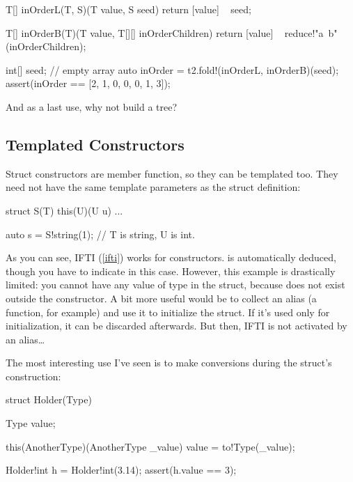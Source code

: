 \begin{dcode}
T[] inOrderL(T, S)(T value, S seed)
{
    return [value] ~ seed;
}

T[] inOrderB(T)(T value, T[][] inOrderChildren)
{
    return [value]  ~  reduce!"a~b"(inOrderChildren);
}

int[] seed; // empty array
auto inOrder = t2.fold!(inOrderL, inOrderB)(seed);
assert(inOrder == [2, 1, 0, 0, 0, 1, 3]);
\end{dcode}

And as a last use, why not build a tree? 


\subsection{Templated Constructors}\label{constructortemplates}

Struct constructors are member function, so they can be templated too. They need not have the same template parameters as the struct definition:

\begin{dcode}
struct S(T)
{
    this(U)(U u) { ... }
}

auto s = S!string(1); // T is string, U is int.
\end{dcode}

As you can see, IFTI (\ref{ifti}) works for constructors.  is automatically deduced, though you have to indicate  in this case. However, this example is drastically limited: you cannot have any value of type  in the struct, because  does not exist outside the constructor. A bit more useful would be to collect an alias (a function, for example) and use it to initialize the struct. If it's used only for initialization, it can be discarded afterwards. But then, IFTI is not activated by an alias\ldots

The most interesting use I've seen is to make conversions during the struct's construction:

\begin{dcode}
struct Holder(Type)
{
    Type value;

    this(AnotherType)(AnotherType _value)
    {
        value = to!Type(_value);
    }
}

Holder!int h = Holder!int(3.14);
assert(h.value == 3);
\end{dcode}

